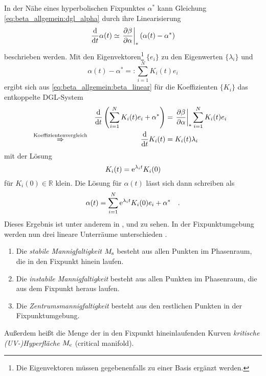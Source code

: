     In der Nähe eines hyperbolischen Fixpunktes $\alpha^*$ kann Gleichung 
    \eqref{eq:beta_allgemein:dgl_alpha} durch ihre Linearisierung
    \begin{equation}
     \frac{\text{d}}{\text{d} t} \alpha(t) \simeq \left.\frac{\partial \beta}{\partial \alpha}\right|_* \left(\alpha(t)-\alpha^*\right) 
     \label{eq:beta_allgemein:beta_linear}
    \end{equation}
     beschrieben werden. Mit den Eigenvektoren\footnote{Die Eigenvektoren 
     müssen gegebenenfalls zu einer Basis ergänzt werden.} $\{e_i\}$ zu den Eigenwerten 
     $\{\lambda_i\}$ und 
     \begin{equation}
      \alpha(t)-\alpha^*=:\sum_{i=1}^N K_i(t) e_i
     \end{equation}
     ergibt sich aus \eqref{eq:beta_allgemein:beta_linear} für die 
     Koeffizienten $\{K_i\}$ das entkoppelte DGL-System
    \begin{align}
     &&\frac{\text{d}}{\text{d} t} \left(\sum\limits_{i=1}^N K_i(t)e_i + \alpha^* \right) &=
     \left.\frac{\partial \beta}{\partial \alpha}\right|_* \sum\limits_{i=1}^N K_i(t) e_i \\
     &\overset{\text{Koeffizientenvergleich}}{\Rightarrow}
     &  \frac{\text{d}}{\text{d} t} K_i(t) &= K_i(t) \lambda_i & \label{eq:beta_allgemein:K} 
    \end{align}
    mit der Lösung
    \begin{equation}
     K_i(t)=\text{e}^{\lambda_i t} K_i(0) \label{eq:beta_allgemein:K_loesung}
    \end{equation}
    für $K_i(0) \in \mathbb{R}$ klein. Die Lösung für $\alpha(t)$ lässt sich dann schreiben als 
    \begin{equation}
     \alpha(t)=\sum\limits_{i=1}^N \text{e}^{\lambda_i t} K_i(0) e_i +\alpha^* 
     \label{eq:beta_allgemein:loesung} \quad .
    \end{equation}
    Dieses Ergebnis ist unter anderem in \cite{Weinberg:1976}, \cite{General_relativity} und 
    \cite{Asymptotic_safety_guaranteed} zu sehen.
    In der Fixpunktumgebung werden nun drei lineare Unterräume unterschieden 
    \cite{Bronstein4}.
    \begin{definition}
     \begin{enumerate}
      \item Die \textit{stabile Mannigfaltigkeit} $M_\text{s}$ besteht aus allen Punkten im Phasenraum, 
      die in den Fixpunkt hinein laufen.
      \item Die \textit{instabile Mannigfaltigkeit} besteht aus allen Punkten im Phasenraum, 
      die aus dem Fixpunkt heraus laufen.
      \item Die \textit{Zentrumsmannigfaltigkeit} besteht aus den restlichen 
      Punkten in der Fix\-punkt\-um\-ge\-bung.
      \end{enumerate}
      Außerdem heißt die Menge der in den Fixpunkt hineinlaufenden Kurven 
      \textit{kritische (UV-)Hyperfläche} $M_\text{c}$ (critical manifold).
    \end{definition}
